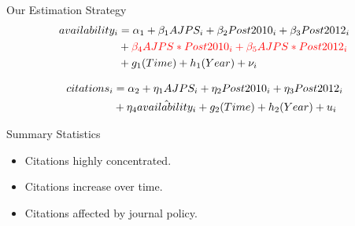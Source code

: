 \documentclass{beamer}
\begin{document}
\begin{frame}{Our Estimation Strategy}
\begin{align}\label{firststage} 
availability_i &= \alpha_1 +\beta_1 AJPS_i + \beta_2 Post2010_i + \beta_3 Post2012_i \\ \notag
& + {\color{red} \beta_4 AJPS*Post2010_i + \beta_5 AJPS*Post2012_i } \\
& + g_1(Time) + h_1(Year) +\nu_i \notag
\end{align}

\begin{align}
citations_i &=\alpha_2 +\eta_1 AJPS_i + \eta_2 Post2010_i+ \eta_3 Post2012_i \\ 
& + \eta_4 \hat{availability_i}+g_2(Time) + h_2(Year) +u_i \notag
\end{align}

\end{frame}
\begin{frame}{Summary Statistics}
\begin{itemize}
\item Citations highly concentrated.
\item Citations increase over time.
\item Citations affected by journal policy.
\end{itemize}
\end{frame}

{ %
    \begin{frame}[plain]
     \end{frame}
     
     \begin{frame}[plain]
     \end{frame}
    
    \begin{frame}[plain]
     \end{frame}
}
\end{document}
